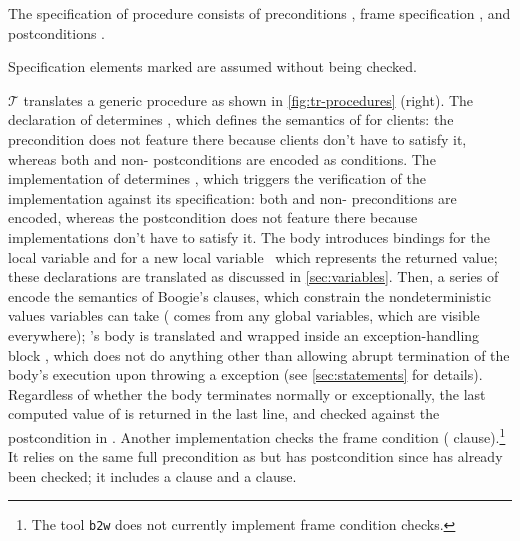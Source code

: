 \documentclass[a4paper,final]{llncs}
\newif\iflong
\newcommand{\tr}{\mathcal{T}}
\newcommand{\btw}{\texttt{b2w}\xspace}
\newcommand{\Boogie}{Boogie\xspace}
\begin{document}
The specification of procedure  consists of preconditions , frame specification , and postconditions .
\iflong
A precondition is an assertion that callers of \B{p} must satisfy upon calling, and that every implementation of \B{p} can assume; \B{free} preconditions need not be satisfied by callers.
A postcondition is an assertion that every implementation of \B{p} must satisfy upon terminating, and that every caller of \B{p} can assume; \B{free} postconditions need not be satisfied by implementations.
Every implementation of \B{p} may only modify the global variables listed in \B{p}'s frame specification.
\else
Specification elements marked  are assumed without being checked.
\fi

$\tr$ translates a generic procedure  as shown in \autoref{fig:tr-procedures} (right).
The declaration of  determines , which defines the semantics of  for clients: the  precondition  does not feature there because clients don't have to satisfy it, whereas both  and non- postconditions are encoded as  conditions.
The implementation of  determines , which triggers the verification of the implementation against its specification: both  and non- preconditions are encoded, whereas the  postcondition  does not feature there because implementations don't have to satisfy it.
The body introduces  bindings for the local variable  and for a new local variable~ which represents the returned value; these declarations are translated as discussed in \autoref{sec:variables}.
Then, a series of  encode the semantics of \Boogie's  clauses, which constrain the nondeterministic values variables can take ( comes from any global variables, which are visible everywhere); 
's body  is translated and wrapped inside an exception-handling block , which does not do anything other than allowing abrupt termination of the body's execution upon throwing a  exception (see \autoref{sec:statements} for details).
Regardless of whether the body terminates normally or exceptionally, the last computed value of  is returned in the last line, and checked against the postcondition in .
\iflong
Another implementation  checks the frame condition ( clause).\footnote{The tool \btw does not currently implement frame condition checks.}
It relies on the same full precondition as  but has postcondition  since  has already been checked; it includes a  clause and a  clause.
\end{document}
